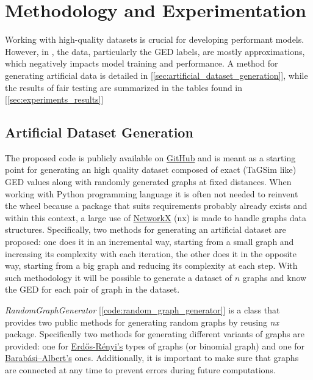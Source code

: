 \documentclass[../Thesis.tex]{subfiles}
\begin{document}
	\chapter{Methodology and Experimentation}
	\label{sec:methodology_and_experimentation}
	
	Working with high-quality datasets is crucial for developing performant models. However, in \cite{computing_graph_edit_distance_via_neural_graph_matching}, the data, particularly the GED labels, are mostly approximations, which negatively impacts model training and performance. A method for generating artificial data is detailed in [\autoref{sec:artificial_dataset_generation}], while the results of fair testing are summarized in the tables found in [\autoref{sec:experiments_results}]
	
	\section{Artificial Dataset Generation}
	\label{sec:artificial_dataset_generation}

	The proposed code is publicly available on \href{https://github.com/FedericoCalabro/gnnged/blob/vldb/1.%20synthetic_dataset_v2.ipynb}{GitHub} and is meant as a starting point for generating an high quality dataset composed of exact (TaGSim like) GED values along with randomly generated graphs at fixed distances.
	When working with Python programming language it is often not needed to reinvent the wheel because a package that suits requirements probably already exists and within this context, a large use of \href{https://networkx.org/}{NetworkX} (nx) is made to handle graphs data structures. Specifically, two methods for generating an artificial dataset are proposed: one does it in an incremental way, starting from a small graph and increasing its complexity with each iteration, the other does it in the opposite way, starting from a big graph and reducing its complexity at each step. With such methodology it will be possible to generate a dataset of $n$ graphs and know the GED for each pair of graph in the dataset.
	
	
	\textit{RandomGraphGenerator} [\autoref{code:random_graph_generator}] is a class that provides two public methods for generating random graphs by reusing \textit{nx} package. Specifically two methods for generating different variants of graphs are provided: one for \href{https://en.wikipedia.org/wiki/Erd%C5%91s%E2%80%93R%C3%A9nyi_model}{Erdős-Rényi's} types of graphs (or binomial graph) and one for \href{https://en.wikipedia.org/wiki/Barab%C3%A1si%E2%80%93Albert_model}{Barabási–Albert's} ones. Additionally, it is important to make sure that graphs are connected at any time to prevent errors during future computations. 
	
\end{document}
